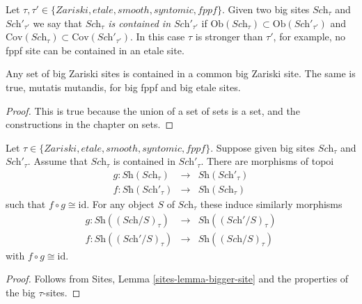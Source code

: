 \medskip\noindent
Let $\tau, \tau' \in \{Zariski, etale, smooth, syntomic, fppf\}$.
Given two big sites $\textit{Sch}_\tau$ and $\textit{Sch}'_{\tau'}$
we say that
{\it $\textit{Sch}_\tau$ is contained in $\textit{Sch}'_{\tau'}$} if
$\text{Ob}(\textit{Sch}_\tau) \subset \text{Ob}(\textit{Sch}'_{\tau'})$
and
$\text{Cov}(\textit{Sch}_\tau) \subset \text{Cov}(\textit{Sch}'_{\tau'})$.
In this case $\tau$ is stronger than $\tau'$, for example, no fppf
site can be contained in an etale site.

\begin{lemma}
\label{lemma-contained-in}
Any set of big Zariski sites is contained in a common big Zariski site.
The same is true, mutatis mutandis, for big fppf and big etale sites.
\end{lemma}

\begin{proof}
This is true because the union of a set of sets is a set, and the
constructions in the chapter on sets.
\end{proof}

\begin{lemma}
\label{lemma-change-alpha-Zariski}
Let $\tau \in \{Zariski, etale, smooth, syntomic, fppf\}$.
Suppose given big sites $\textit{Sch}_\tau$ and $\textit{Sch}'_\tau$.
Assume that $\textit{Sch}_\tau$ is contained in $\textit{Sch}'_\tau$.
There are morphisms of topoi
\begin{eqnarray*}
g : \textit{Sh}(\textit{Sch}_\tau) &
\longrightarrow &
\textit{Sh}(\textit{Sch}'_\tau) \\
f : \textit{Sh}(\textit{Sch}'_\tau) &
\longrightarrow &
\textit{Sh}(\textit{Sch}_\tau)
\end{eqnarray*}
such that $f \circ g \cong \text{id}$. For any object $S$ of
$\textit{Sch}_\tau$ these induce similarly morphisms
\begin{eqnarray*}
g : \textit{Sh}((\textit{Sch}/S)_\tau) &
\longrightarrow &
\textit{Sh}((\textit{Sch}'/S)_\tau) \\
f : \textit{Sh}((\textit{Sch}'/S)_\tau) &
\longrightarrow &
\textit{Sh}((\textit{Sch}/S)_\tau)
\end{eqnarray*}
with $f \circ g \cong \text{id}$.
\end{lemma}

\begin{proof}
Follows from Sites, Lemma \ref{sites-lemma-bigger-site} and the properties of
the big $\tau$-sites.
\end{proof}

